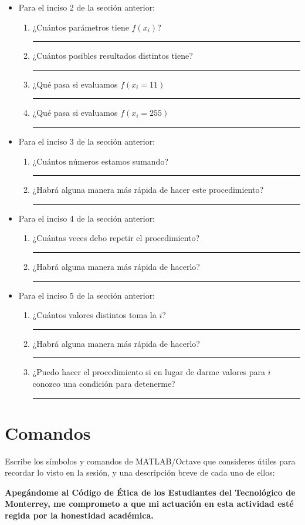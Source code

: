 \documentclass[spanish, 10pt]{article}
\newcommand{\shortresponserule}{{\large\rule{5 cm}{0.3mm}}}
\newcommand{\veryshortresponserule}{{\large\rule{3 cm}{0.3mm}}}
\begin{document}
\begin{itemize}
	\item Para el inciso 2 de la sección anterior:
	\begin{enumerate}
        \item ¿Cuántos parámetros tiene $f(x_i)$? \hfill \shortresponserule
        \item ¿Cuántos posibles resultados distintos tiene? \hfill \shortresponserule
        \item ¿Qué pasa si evaluamos $f(x_i=11)$ \hfill \shortresponserule
        \item ¿Qué pasa si evaluamos $f(x_i=255)$ \hfill \shortresponserule
    \end{enumerate}
	\item Para el inciso 3 de la sección anterior:
	\begin{enumerate}
        \item ¿Cuántos números estamos sumando? \hfill \shortresponserule
        \item ¿Habrá alguna manera más rápida de hacer este procedimiento? \hfill \veryshortresponserule
    \end{enumerate}
	\item Para el inciso 4 de la sección anterior:
	\begin{enumerate}
        \item ¿Cuántas veces debo repetir el procedimiento? \hfill \shortresponserule
        \item ¿Habrá alguna manera más rápida de hacerlo? \hfill \shortresponserule
    \end{enumerate}
    \item Para el inciso 5 de la sección anterior:
	\begin{enumerate}
        \item ¿Cuántos valores distintos toma la $i$? \hfill \shortresponserule
        \item ¿Habrá alguna manera más rápida de hacerlo? \hfill \shortresponserule
        \item ¿Puedo hacer el procedimiento si en lugar de darme valores para $i$ conozco una condición para detenerme?
        \hfill \shortresponserule
    \end{enumerate}
\end{itemize}

\section{Comandos}

Escribe los símbolos y comandos de MATLAB/Octave que consideres útiles para recordar lo visto en la sesión, y una descripción breve de cada uno de ellos:

\vfill

\textbf{Apegándome al Código de Ética de los Estudiantes del Tecnológico de Monterrey, me comprometo a que mi actuación en esta actividad esté regida por la honestidad académica.}
\end{document}
